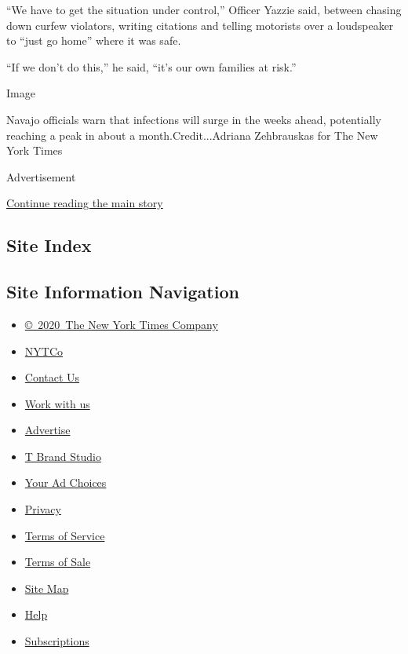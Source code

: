 ``We have to get the situation under control,'' Officer Yazzie said,
between chasing down curfew violators, writing citations and telling
motorists over a loudspeaker to ``just go home'' where it was safe.

``If we don't do this,'' he said, ``it's our own families at risk.''

Image

Navajo officials warn that infections will surge in the weeks ahead,
potentially reaching a peak in about a month.Credit...Adriana
Zehbrauskas for The New York Times

Advertisement

\protect\hyperlink{after-bottom}{Continue reading the main story}

\hypertarget{site-index}{%
\subsection{Site Index}\label{site-index}}

\hypertarget{site-information-navigation}{%
\subsection{Site Information
Navigation}\label{site-information-navigation}}

\begin{itemize}
\tightlist
\item
  \href{https://help.nytimes.com/hc/en-us/articles/115014792127-Copyright-notice}{©~2020~The
  New York Times Company}
\end{itemize}

\begin{itemize}
\tightlist
\item
  \href{https://www.nytco.com/}{NYTCo}
\item
  \href{https://help.nytimes.com/hc/en-us/articles/115015385887-Contact-Us}{Contact
  Us}
\item
  \href{https://www.nytco.com/careers/}{Work with us}
\item
  \href{https://nytmediakit.com/}{Advertise}
\item
  \href{http://www.tbrandstudio.com/}{T Brand Studio}
\item
  \href{https://www.nytimes.com/privacy/cookie-policy\#how-do-i-manage-trackers}{Your
  Ad Choices}
\item
  \href{https://www.nytimes.com/privacy}{Privacy}
\item
  \href{https://help.nytimes.com/hc/en-us/articles/115014893428-Terms-of-service}{Terms
  of Service}
\item
  \href{https://help.nytimes.com/hc/en-us/articles/115014893968-Terms-of-sale}{Terms
  of Sale}
\item
  \href{https://spiderbites.nytimes.com}{Site Map}
\item
  \href{https://help.nytimes.com/hc/en-us}{Help}
\item
  \href{https://www.nytimes.com/subscription?campaignId=37WXW}{Subscriptions}
\end{itemize}
